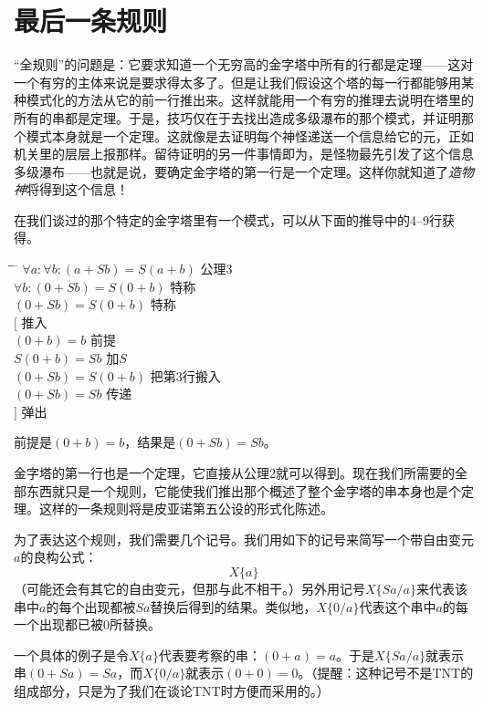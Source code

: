 \section{最后一条规则}

“全规则”的问题是：它要求知道一个无穷高的金字塔中所有的行都是定理——这对一个有穷的主体来说是要求得太多了。但是让我们假设这个塔的每一行都能够用某种模式化的方法从它的前一行推出来。这样就能用一个有穷的推理去说明在塔里的所有的串都是定理。于是，技巧仅在于去找出造成多级瀑布的那个模式，并证明那个模式本身就是一个定理。这就像是去证明每个神怪递送一个信息给它的元，正如机关里的层层上报那样。留待证明的另一件事情即为，是怪物最先引发了这个信息多级瀑布——也就是说，要确定金字塔的第一行是一个定理。这样你就知道了\emph{造物神}将得到这个信息！

在我们谈过的那个特定的金字塔里有一个模式，可以从下面的推导中的4--9行获得。

\begin{tabbing*}
\indent\indent \= \quad \= \tabindent{-2em} \= \+\kill
$\forall a:\forall b:(a+Sb)=S(a+b)$ \> \>公理3\\
$\forall b:(0+Sb)=S(0+b)$ \>           \>特称\\
$(0+Sb)=S(0+b)$ \>                     \>特称\\
$[$ \>                                 \>推入\+\\
  $(0+b)=b$                            \>前提\\
  $S(0+b)=Sb$                          \>加$S$\\
  $(0+Sb)=S(0+b)$                      \>把第3行搬入\\
  $(0+Sb)=Sb$                          \>传递\-\\
$]$ \>                                 \>弹出
\end{tabbing*}
前提是$(0+b)=b$，结果是$(0+Sb)=Sb$。

金字塔的第一行也是一个定理，它直接从公理2就可以得到。现在我们所需要的全部东西就只是一个规则，它能使我们推出那个概述了整个金字塔的串本身也是个定理。这样的一条规则将是皮亚诺第五公设的形式化陈述。

为了表达这个规则，我们需要几个记号。我们用如下的记号来简写一个带自由变元$a$的良构公式：
\[
X\{a\}
\]
（可能还会有其它的自由变元，但那与此不相干。）另外用记号$X\{Sa/a\}$来代表该串中$a$的每个出现都被$Sa$替换后得到的结果。类似地，$X\{0/a\}$代表这个串中$a$的每一个出现都已被$0$所替换。

一个具体的例子是令$X\{a\}$代表要考察的串：$(0+a)=a$。于是$X\{Sa/a\}$就表示串$(0+Sa)=Sa$，而$X\{0/a\}$就表示$(0+0)=0$。（提醒：这种记号不是TNT的组成部分，只是为了我们在谈论TNT时方便而采用的。）

